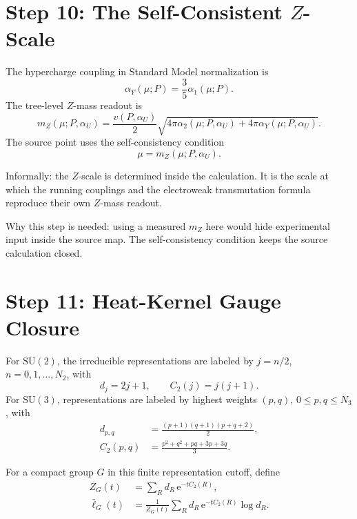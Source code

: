 \documentclass[11pt]{article}
\theoremstyle{remark}
\newcommand{\SU}{\mathrm{SU}}
\newcommand{\e}{\mathrm e}
\begin{document}
\section{Step 10: The Self-Consistent \(Z\)-Scale}

The hypercharge coupling in Standard Model normalization is
\begin{equation}
\alpha_Y(\mu;P)=\frac{3}{5}\alpha_1(\mu;P).
\label{eq:alphaY}
\end{equation}
The tree-level \(Z\)-mass readout is
\begin{equation}
m_Z(\mu;P,\alpha_U)
=
\frac{v(P,\alpha_U)}{2}
\sqrt{4\pi\alpha_2(\mu;P,\alpha_U)+4\pi\alpha_Y(\mu;P,\alpha_U)}.
\label{eq:mZtree}
\end{equation}
The source point uses the self-consistency condition
\begin{equation}
\mu=m_Z(\mu;P,\alpha_U).
\label{eq:mZfixed}
\end{equation}

Informally: the \(Z\)-scale is determined inside the calculation. It is the scale at which the running couplings and the electroweak transmutation formula reproduce their own \(Z\)-mass readout.

Why this step is needed: using a measured \(m_Z\) here would hide experimental input inside the source map. The self-consistency condition keeps the source calculation closed.

\section{Step 11: Heat-Kernel Gauge Closure}

For \(\SU(2)\), the irreducible representations are labeled by \(j=n/2\), \(n=0,1,\ldots,N_2\), with
\begin{equation}
d_j=2j+1,
\qquad
C_2(j)=j(j+1).
\label{eq:su2rep}
\end{equation}
For \(\SU(3)\), representations are labeled by highest weights \((p,q)\), \(0\le p,q\le N_3\), with
\begin{align}
d_{p,q}&=\frac{(p+1)(q+1)(p+q+2)}{2},
\label{eq:su3dim}\\
C_2(p,q)&=\frac{p^2+q^2+pq+3p+3q}{3}.
\label{eq:su3casimir}
\end{align}

For a compact group \(G\) in this finite representation cutoff, define
\begin{align}
Z_G(t)&=\sum_R d_R\,\e^{-tC_2(R)},\\
\bar\ell_G(t)&=
\frac{1}{Z_G(t)}
\sum_R d_R\,\e^{-tC_2(R)}\log d_R.
\label{eq:ellbar}
\end{align}
\end{document}
